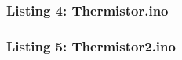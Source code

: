 \documentclass[11.5pt]{article}
\begin{document}
\pagebreak

\subsubsection{Listing 4: Thermistor.ino} \label{D4}


\pagebreak

\subsubsection{Listing 5: Thermistor2.ino} \label{D5}

\end{document}
